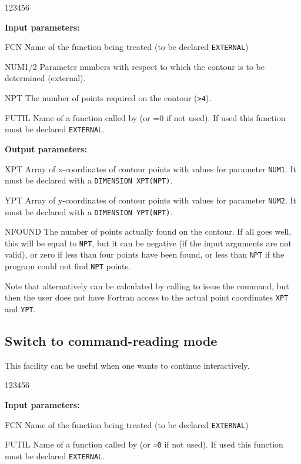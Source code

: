 \begin{DLtt}{123456}
\item[{\rm\bf Input parameters:}]
\item[FCN]    Name of the function being treated (to be declared \texttt{EXTERNAL})
\item[NUM1/2] Parameter numbers with respect to which the contour
              is to be determined (external).
\item[NPT]    The number of points required on the contour (\texttt{>4}).
\item[FUTIL]  Name of a function called by  (or =0 if not used).
              If used this function must be declared \texttt{EXTERNAL}.
\item[{\rm\bf Output parameters:}]
\item[XPT]    Array of x-coordinates of contour points with 
              values for parameter \texttt{NUM1}.
              It must be declared with a \texttt{DIMENSION XPT(NPT)}.
\item[YPT]    Array of y-coordinates of contour points with
              values for parameter \texttt{NUM2}.
              It must be declared with a \texttt{DIMENSION YPT(NPT)}.
\item[NFOUND] The number of points actually found on the contour.
              If all goes well, this will be equal to \texttt{NPT}, but it can be
              negative (if the input arguments are not valid), or zero if
              less than four points have been found, or less than \texttt{NPT} if the
              program could not find \texttt{NPT} points.
\end{DLtt}
 
Note that alternatively  can be calculated
by calling  to issue the  command,
but then the user does not have Fortran access to the actual
point coordinates \texttt{XPT} and \texttt{YPT}.
 
\subsection{Switch to command-reading mode}

This facility can be useful when one wants to continue interactively.

 
\begin{DLtt}{123456}
\item[{\rm\bf Input parameters:}]
\item[FCN]    Name of the function being treated (to be declared \texttt{EXTERNAL})
\item[FUTIL]  Name of a function called by  (or \texttt{=0} if not used).
              If used this function must be declared \texttt{EXTERNAL}.
\end{DLtt}
 
